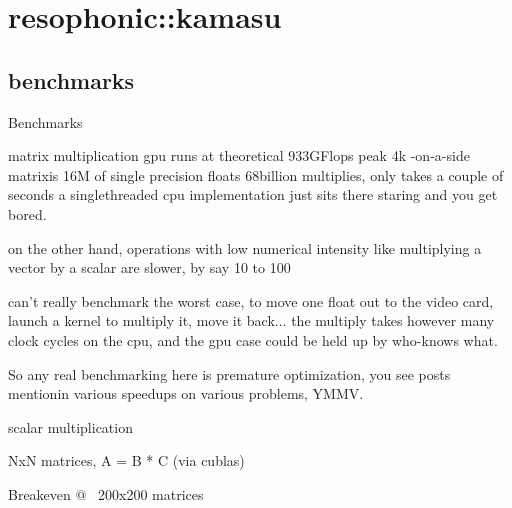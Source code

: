 \section{resophonic::kamasu}
\subsection{benchmarks}

\begin{frame}{Benchmarks}
\end{frame}


\begin{frame}{matrix multiplication}
gpu runs at theoretical 933GFlops peak 4k -on-a-side matrixis 16M of
single precision floats 68billion multiplies, only takes a couple of
seconds a singlethreaded cpu implementation just sits there staring
and you get bored.

on the other hand, operations with low numerical intensity like
multiplying a vector by a scalar are slower, by say 10 to 100

can't really benchmark the worst case, to move one float out to the
video card, launch a kernel to multiply it, move it back... the
multiply takes however many clock cycles on the cpu, and the gpu case
could be held up by who-knows what.   

So any real benchmarking here is premature optimization, you see posts
mentionin various speedups on various problems, YMMV.  
\end{frame}

\begin{frame}{scalar multiplication}

\end{frame}

\begin{frame}{NxN matrices,   A = B * C  (via cublas)}


\end{frame}

\begin{frame}{Breakeven @  ~200x200 matrices}


\end{frame}

